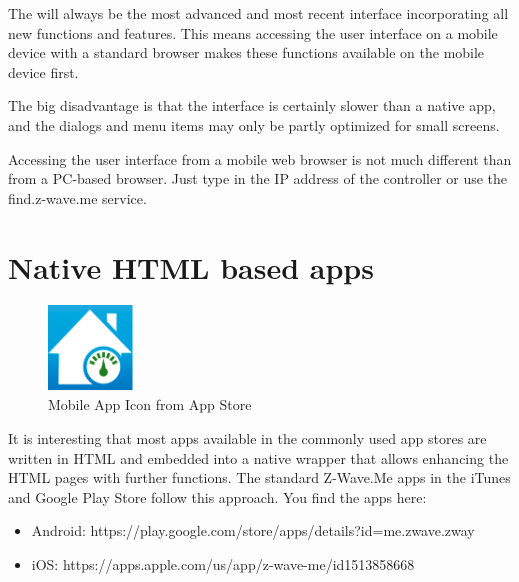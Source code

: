The \zwshui will always be the most advanced and most recent interface 
incorporating all new functions and features. This means accessing the user interface 
on a mobile device with a standard browser makes these functions available on the 
mobile device first.

The big disadvantage is that the interface is certainly slower than a native app, and the 
dialogs and menu items may only be partly optimized for small screens.

Accessing the user interface from a mobile web browser is not much different than from a 
PC-based browser. Just type in the IP address of the controller or use the find.z-wave.me service.

\section{Native HTML based apps}

\begin{figure}
\begin{center}
\includegraphics[width=0.2\textwidth]{pngs/cap5/mobile2.png}
\caption{Mobile App Icon from App Store}
\label{mobile2}
\end{center}
\end{figure}

It is interesting that most apps available in the commonly used app stores are written 
in HTML and embedded into a native wrapper that allows enhancing the HTML pages with 
further functions. The standard Z-Wave.Me apps in the iTunes and Google Play Store follow 
this approach. You find the apps here:

\begin{itemize}
\item Android: https://play.google.com/store/apps/details?id=me.zwave.zway
\item iOS: https://apps.apple.com/us/app/z-wave-me/id1513858668
\end{itemize}


